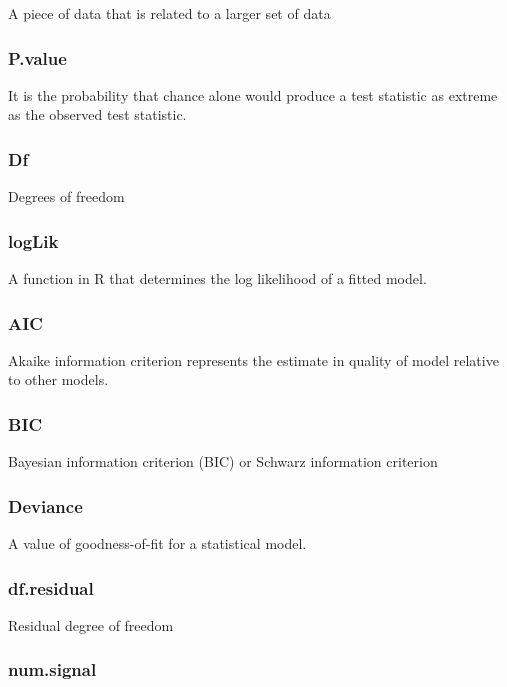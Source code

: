 \documentclass[10pt,letterpaper]{article}
\begin{document}
A piece of data that is related to a larger set of data

\subsubsection{P.value}\label{p.value}

It is the probability that chance alone would produce a test statistic
as extreme as the observed test statistic.

\subsubsection{Df}\label{df}

Degrees of freedom

\subsubsection{logLik}\label{loglik}

A function in R that determines the log likelihood of a fitted model.

\subsubsection{AIC}\label{aic}

Akaike information criterion represents the estimate in quality of model
relative to other models.

\subsubsection{BIC}\label{bic}

Bayesian information criterion (BIC) or Schwarz information criterion

\subsubsection{Deviance}\label{deviance}

A value of goodness-of-fit for a statistical model.

\subsubsection{df.residual}\label{df.residual}

Residual degree of freedom

\subsubsection{num.signal}\label{num.signal}
\end{document}

